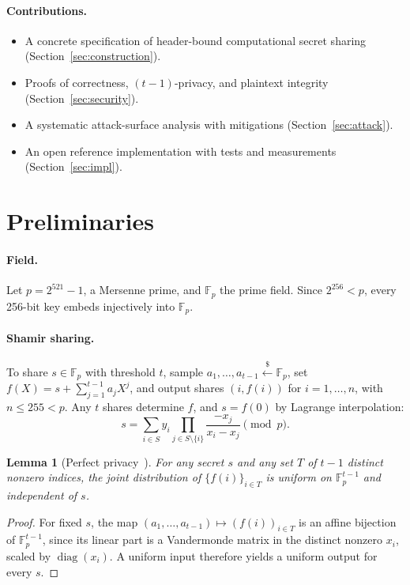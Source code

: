 \documentclass[11pt]{article}
\newtheorem{lemma}{Lemma}
\theoremstyle{definition}
\newcommand{\F}{\mathbb{F}_p}
\begin{document}
\paragraph{Contributions.}
\begin{itemize}
  \item A concrete specification of header-bound computational secret sharing (Section~\ref{sec:construction}).
  \item Proofs of correctness, $(t-1)$-privacy, and plaintext integrity (Section~\ref{sec:security}).
  \item A systematic attack-surface analysis with mitigations (Section~\ref{sec:attack}).
  \item An open reference implementation with tests and measurements (Section~\ref{sec:impl}).
\end{itemize}

\section{Preliminaries}
\paragraph{Field.} Let $p = 2^{521}-1$, a Mersenne prime, and $\F$ the prime field. Since $2^{256} < p$, every 256-bit key embeds injectively into $\F$.

\paragraph{Shamir sharing.} To share $s \in \F$ with threshold $t$, sample $a_1,\dots,a_{t-1} \xleftarrow{\$} \F$, set $f(X) = s + \sum_{j=1}^{t-1} a_j X^j$, and output shares $(i, f(i))$ for $i = 1,\dots,n$, with $n \le 255 < p$. Any $t$ shares determine $f$, and $s = f(0)$ by Lagrange interpolation:
\begin{equation}
  s = \sum_{i \in S} y_i \prod_{j \in S\setminus\{i\}} \frac{-x_j}{x_i - x_j} \pmod p .
\end{equation}

\begin{lemma}[Perfect privacy~\cite{shamir1979}]\label{lem:shamir}
For any secret $s$ and any set $T$ of $t-1$ distinct nonzero indices, the joint distribution of $\{f(i)\}_{i\in T}$ is uniform on $\F^{t-1}$ and independent of $s$.
\end{lemma}
\begin{proof}
For fixed $s$, the map $(a_1,\dots,a_{t-1}) \mapsto (f(i))_{i\in T}$ is an affine bijection of $\F^{t-1}$, since its linear part is a Vandermonde matrix in the distinct nonzero $x_i$, scaled by $\operatorname{diag}(x_i)$. A uniform input therefore yields a uniform output for every $s$.
\end{proof}
\end{document}

